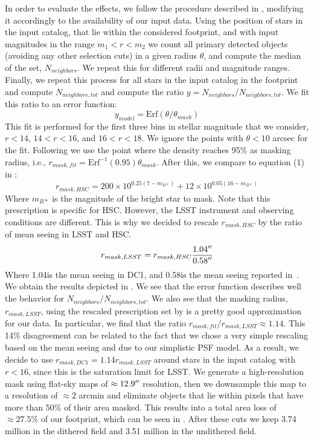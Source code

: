 \documentclass[twocolumn]{aastex62}
\begin{document}
In order to evaluate the effects, we follow the procedure described in \citet{2018PASJ...70S...7C}, modifying it accordingly to the availability of our input data. Using the position of stars in the input catalog, that lie within the considered footprint, and with input magnitudes in the range $m_{1} < r < m_{2}$ we count all primary detected objects (avoiding any other selection cuts) in a given radius $\theta$, and compute the median of the set, $N_{neighbors}$. We repeat this for different radii and magnitude ranges. Finally, we repeat this process for all stars in the input catalog in the footprint and compute $N_{neighbors, tot}$ and compute the ratio $y = N_{neighbors}/N_{neighbors, tot}$. We fit this ratio to an error function:
\begin{equation}
y_{model} = \mathrm{Erf}\left({\theta/\theta_{mask}}\right)
\end{equation}
This fit is performed for the first three bins in stellar magnitude that we consider, $r < 14$, $14 < r < 16$, and $16 < r < 18$. We ignore the points with $\theta < 10$ arcsec for the fit. Following \citet{2018PASJ...70S...7C} we use the point where the density reaches 95\% as masking radius, i.e., $r_{mask,fit} = \mathrm{Erf}^{-1}(0.95) \theta_{mask}$. After this, we compare to equation (1) in \citet{2018PASJ...70S..25M}:
\begin{equation}
r_{mask,HSC} = 200\times 10^{0.25(7-m_{B*})} + 12 \times 10^{0.05(16-m_{B*})} 
\end{equation}
Where $m_{B*}$ is the magnitude of the bright star to mask. Note that this prescription is specific for HSC. However, the LSST instrument and observing conditions are different. This is why we decided to rescale $r_{mask,HSC}$ by the ratio of mean seeing in LSST and HSC.
\begin{equation}
r_{mask,LSST} = r_{mask,HSC} \frac{1.04\arcsec}{0.58\arcsec}
\end{equation}
Where 1.04\arcsec is the mean seeing in DC1, and 0.58\arcsec is the mean seeing reported in~\citet{2018PASJ...70S..25M}. We obtain the results depicted in . We see that the error function describes well the behavior for $N_{neighbors}/N_{neighbors,tot}$. We also see that the masking radius, $r_{mask,LSST}$, using the rescaled prescription set by \citet{2018PASJ...70S..25M} is a pretty good approximation for our data. In particular, we find that the ratio $r_{mask,fit}/r_{mask,LSST} \approx 1.14$. This 14\% disagreement can be related to the fact that we chose a very simple rescaling based on the mean seeing and due to our simplistic PSF model. As a result, we decide to use $r_{mask, DC1} = 1.14 r_{mask, LSST}$ around stars in the input catalog with $r < 16$, since this is the saturation limit for LSST. We generate a high-resolution mask using flat-sky maps of $\approx 12.9 \mbox{$^{\prime\prime}$}$ resolution, then we downsample this map to a resolution of $\approx 2$ arcmin and eliminate objects that lie within pixels that have more than 50\% of their area masked. This results into a total area loss of $\approx 27.5\%$ of our footprint, which can be seen in . After these cuts we keep 3.74 million in the dithered field and 3.51 million in the undithered field.
\end{document}
